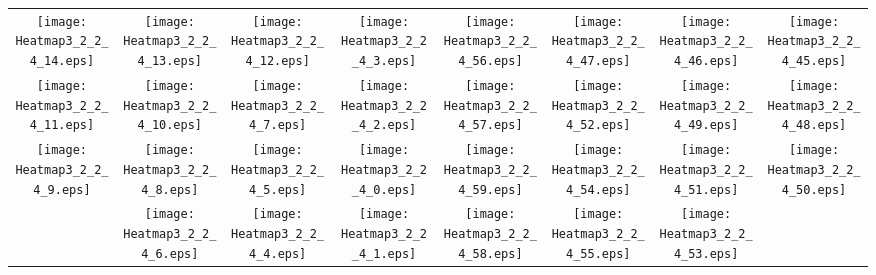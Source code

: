 \documentclass{standalone}
\begin{document}
\begin{tabular}{ *8{c} }
\texttt{[image: Heatmap3\_2\_2\_4\_14.eps]} & \texttt{[image: Heatmap3\_2\_2\_4\_13.eps]} & \texttt{[image: Heatmap3\_2\_2\_4\_12.eps]} & \texttt{[image: Heatmap3\_2\_2\_4\_3.eps]} & \texttt{[image: Heatmap3\_2\_2\_4\_56.eps]} & \texttt{[image: Heatmap3\_2\_2\_4\_47.eps]} & \texttt{[image: Heatmap3\_2\_2\_4\_46.eps]} & \texttt{[image: Heatmap3\_2\_2\_4\_45.eps]} \\
\texttt{[image: Heatmap3\_2\_2\_4\_11.eps]} & \texttt{[image: Heatmap3\_2\_2\_4\_10.eps]} & \texttt{[image: Heatmap3\_2\_2\_4\_7.eps]} & \texttt{[image: Heatmap3\_2\_2\_4\_2.eps]} & \texttt{[image: Heatmap3\_2\_2\_4\_57.eps]} & \texttt{[image: Heatmap3\_2\_2\_4\_52.eps]} & \texttt{[image: Heatmap3\_2\_2\_4\_49.eps]} & \texttt{[image: Heatmap3\_2\_2\_4\_48.eps]} \\
\texttt{[image: Heatmap3\_2\_2\_4\_9.eps]} & \texttt{[image: Heatmap3\_2\_2\_4\_8.eps]} & \texttt{[image: Heatmap3\_2\_2\_4\_5.eps]} & \texttt{[image: Heatmap3\_2\_2\_4\_0.eps]} & \texttt{[image: Heatmap3\_2\_2\_4\_59.eps]} & \texttt{[image: Heatmap3\_2\_2\_4\_54.eps]} & \texttt{[image: Heatmap3\_2\_2\_4\_51.eps]} & \texttt{[image: Heatmap3\_2\_2\_4\_50.eps]} \\
 & \texttt{[image: Heatmap3\_2\_2\_4\_6.eps]} & \texttt{[image: Heatmap3\_2\_2\_4\_4.eps]} & \texttt{[image: Heatmap3\_2\_2\_4\_1.eps]} & \texttt{[image: Heatmap3\_2\_2\_4\_58.eps]} & \texttt{[image: Heatmap3\_2\_2\_4\_55.eps]} & \texttt{[image: Heatmap3\_2\_2\_4\_53.eps]} &  
\end{tabular}
\end{document}
